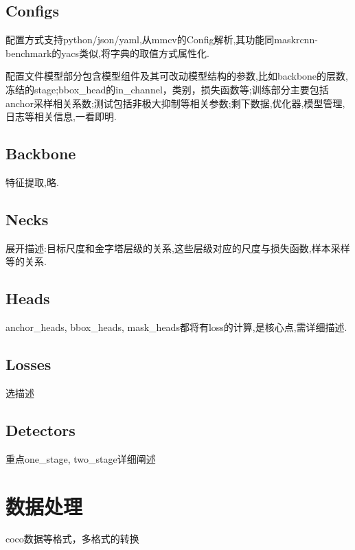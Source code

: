 \documentclass[UTF8]{ctexart}
\begin{document}
\subsection{Configs}
配置方式支持python/json/yaml,从mmcv的Config解析,其功能同maskrcnn-benchmark的yacs类似,将字典的取值方式属性化.

配置文件模型部分包含模型组件及其可改动模型结构的参数,比如backbone的层数,冻结的stage;bbox\_head的in\_channel，类别，损失函数等;训练部分主要包括anchor采样相关系数;测试包括非极大抑制等相关参数;剩下数据,优化器,模型管理,日志等相关信息,一看即明.


\subsection{Backbone}
特征提取,略.
\subsection{Necks}
展开描述:目标尺度和金字塔层级的关系,这些层级对应的尺度与损失函数,样本采样等的关系.
\subsection{Heads}
anchor\_heads, bbox\_heads, mask\_heads都将有loss的计算,是核心点,需详细描述.


\subsection{Losses}
选描述
\subsection{Detectors}
重点one\_stage, two\_stage详细阐述

\section{数据处理}
\label{sec:detail}
coco数据等格式，多格式的转换
\end{document}
